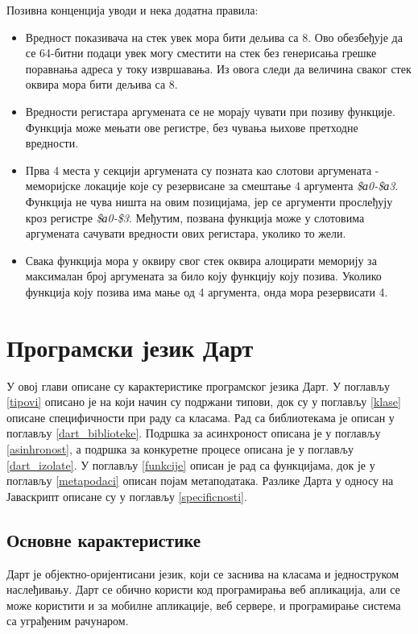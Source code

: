 \documentclass[12pt,oneside]{memoir}
\begin{document}
Позивна конценција уводи и нека додатна правила:
\begin{itemize}

\item Вредност показивача на стек увек мора бити дељива са 8. Ово обезбеђује да се 64-битни подаци увек могу сместити на стек без генерисања грешке поравнања адреса у току извршавања. Из овога следи да величина сваког стек оквира мора бити дељива са 8.

\item Вредности регистара аргумената се не морају чувати при позиву функције. Функција може мењати ове регистре, без чувања њихове претходне вредности.

\item Прва 4 места у секцији аргумената су позната као слотови аргумената - меморијске локације које су резервисане за смештање 4 аргумента \textit{\$а0-\$а3}. Функција не чува ништа на овим позицијама, јер се аргументи прослеђују кроз регистре \textit{\$а0-\$3}. Међутим, позвана функција може у слотовима аргумената сачувати вредности ових регистара, уколико то жели.

\item Свака функција мора у оквиру свог стек оквира алоцирати меморију за максималан број аргумената за било коју функцију коју позива. Уколико функција коју позива има мање од 4 аргумента, онда мора резервисати 4.
\end{itemize}


\chapter{Програмски језик Дарт}
\label{chp:dart}
У овој глави описане су карактеристике програмског језика Дарт. У поглављу \ref{tipovi} описано је на који начин су подржани типови, док су у поглављу \ref{klase} описане специфичности при раду са класама. Рад са библиотекама је описан у поглављу \ref{dart_biblioteke}. Подршка за асинхроност описана је у поглављу \ref{asinhronost}, а подршка за конкуретне процесе описана је у поглављу \ref{dart_izolate}. У поглављу \ref{funkcije} описан је рад са функцијама, док је у поглављу \ref{metapodaci} описан појам метаподатака. Разлике Дарта у односу на Јаваскрипт описане су у поглављу \ref{specificnosti}.

\section{Основне карактеристике}
Дарт је објектно-оријентисани језик, који се заснива на класама и једноструком наслеђивању. Дарт се обично користи код програмирања веб апликација, али се може користити и за мобилне апликације, веб сервере, и програмирање система са уграђеним рачунаром.
\end{document}
